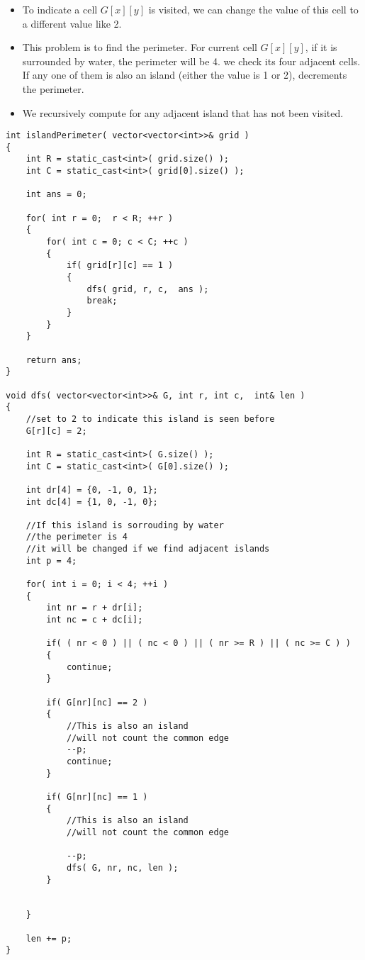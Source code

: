 \begin{itemize}
\item To indicate a cell $G[x][y]$ is visited, we can change the value of this cell to a different value like 2.
\item This problem is to find the perimeter. For current cell $G[x][y]$, if it is surrounded by water, the perimeter will be 4. we check its four adjacent cells. If any one of them is also an island (either the value is 1 or 2), decrements the perimeter.
\item We recursively compute for any adjacent island that has not been visited.
\end{itemize}

\setcounter{lstlisting}{0}
\begin{lstlisting}[style=customc, caption={DFS}]
int islandPerimeter( vector<vector<int>>& grid )
{
    int R = static_cast<int>( grid.size() );
    int C = static_cast<int>( grid[0].size() );

    int ans = 0;

    for( int r = 0;  r < R; ++r )
    {
        for( int c = 0; c < C; ++c )
        {
            if( grid[r][c] == 1 )
            {
                dfs( grid, r, c,  ans );
                break;
            }
        }
    }

    return ans;
}

void dfs( vector<vector<int>>& G, int r, int c,  int& len )
{
    //set to 2 to indicate this island is seen before
    G[r][c] = 2;

    int R = static_cast<int>( G.size() );
    int C = static_cast<int>( G[0].size() );

    int dr[4] = {0, -1, 0, 1};
    int dc[4] = {1, 0, -1, 0};

    //If this island is sorrouding by water
    //the perimeter is 4
    //it will be changed if we find adjacent islands
    int p = 4;

    for( int i = 0; i < 4; ++i )
    {
        int nr = r + dr[i];
        int nc = c + dc[i];

        if( ( nr < 0 ) || ( nc < 0 ) || ( nr >= R ) || ( nc >= C ) )
        {
            continue;
        }

        if( G[nr][nc] == 2 )
        {
            //This is also an island
            //will not count the common edge
            --p;
            continue;
        }

        if( G[nr][nc] == 1 )
        {
            //This is also an island
            //will not count the common edge

            --p;
            dfs( G, nr, nc, len );
        }


    }

    len += p;
}
\end{lstlisting}